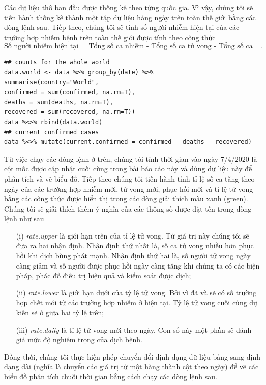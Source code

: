 \documentclass[12pt, a4paper,oneside]{book}
\theoremstyle{definition}
\begin{document}
Các dữ liệu thô ban đầu được thống kê theo từng quốc gia. Vì vậy, chúng tôi sẽ tiến hành thống kê thành một tập dữ liệu hàng ngày trên toàn thế giới bằng các dòng lệnh sau. Tiếp theo, chúng tôi sẽ tính số người nhiễm hiện tại của các trường hợp nhiễm bệnh trên toàn thế giới được tính theo công thức
$$\text{Số người nhiễm hiện tại = Tổng số ca nhiễm - Tổng số ca tử vong - Tổng số ca phục hồi}.$$
\begin{lstlisting}
## counts for the whole world
data.world <- data %>% group_by(date) %>%
summarise(country="World",
confirmed = sum(confirmed, na.rm=T),
deaths = sum(deaths, na.rm=T),
recovered = sum(recovered, na.rm=T))
data %<>% rbind(data.world)
## current confirmed cases
data %<>% mutate(current.confirmed = confirmed - deaths - recovered)
\end{lstlisting}
Từ việc chạy các dòng lệnh ở trên, chúng tôi tính thời gian vào ngày 7/4/2020 là cột mốc được cập nhật cuối cùng trong bài báo cáo này và dùng dữ liệu này để  phân tích và vẽ biểu đồ.
Tiếp theo chúng tôi tiến hành tính tỉ lệ số ca tăng theo ngày của các trường hợp nhiễm mới, tử vong mới, phục hồi mới và tỉ lệ tử vong bằng các công thức được hiển thị trong các dòng giải thích màu xanh (green). Chúng tôi sẽ giải thích thêm ý nghĩa của các thông số được đặt tên trong dòng lệnh như sau
\begin{itemize}
	\item[(i)]\textit{rate.upper} là giới hạn trên của tỉ lệ tử vong. Từ giá trị này chúng tôi sẽ đưa ra hai nhận định. Nhận định thứ nhất là, số ca tử vong nhiều hơn phục hồi khi dịch bùng phát mạnh. Nhận định thứ hai là, số người tử vong ngày càng giảm và số người được phục hồi ngày càng tăng khi chúng ta có các biện pháp, phác đồ điều trị hiệu quả và kiểm soát được dịch;
	\item[(ii)]\textit{rate.lower} là giới hạn dưới của tỷ lệ tử vong. Bởi vì đã và sẽ có số trường hợp chết mới từ các trường hợp nhiễm ở hiện tại. Tỷ lệ tử vong cuối cùng dự kiến sẽ ở giữa hai tỷ lệ trên;
	\item[(iii)]\textit{rate.daily} là tỉ lệ tử vong mới theo ngày. Con số này một phần sẽ đánh giá mức độ nghiêm trọng của dịch bệnh.
\end{itemize}
Đồng thời, chúng tôi thực hiện phép chuyển đổi định dạng dữ liệu bảng sang định dạng dài (nghĩa là chuyển các giá trị từ một hàng thành cột theo ngày) để vẽ các biểu đồ phân tích chuỗi thời gian bằng cách chạy các dòng lệnh sau.
\end{document}
